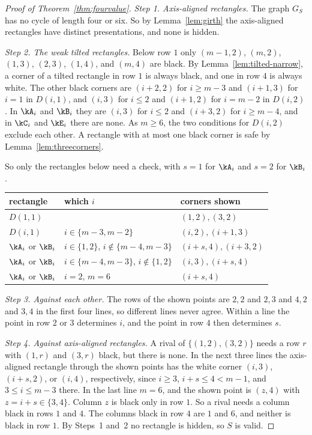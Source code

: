\begin{proof}[Proof of Theorem~\ref{thm:fourvalue}]
\emph{Step 1. Axis-aligned rectangles.} The graph $G_S$ has no cycle of length four or six. So by Lemma~\ref{lem:girth} the axis-aligned rectangles have distinct presentations, and none is hidden.

\emph{Step 2. The weak tilted rectangles.} Below row $1$ only $(m-1,2)$, $(m,2)$, $(1,3)$, $(2,3)$, $(1,4)$, and $(m,4)$ are black. By Lemma~\ref{lem:tilted-narrow}, a corner of a tilted rectangle in row $1$ is always black, and one in row $4$ is always white. The other black corners are $(i+2,2)$ for $i\ge m-3$ and $(i+1,3)$ for $i=1$ in $D(i,1)$, and $(i,3)$ for $i\le2$ and $(i+1,2)$ for $i=m-2$ in $D(i,2)$. In $\kA_i$ and $\kB_i$ they are $(i,3)$ for $i\le2$ and $(i+3,2)$ for $i\ge m-4$, and in $\kC_i$ and $\kE_i$ there are none. As $m\ge6$, the two conditions for $D(i,2)$ exclude each other. A rectangle with at most one black corner is safe by Lemma~\ref{lem:threecorners}.

So only the rectangles below need a check, with $s=1$ for $\kA_i$ and $s=2$ for $\kB_i$.
\begin{center}\small
\begin{tabular}{@{}lll@{}}
\toprule
rectangle & which $i$ & corners shown\\
\midrule
$D(1,1)$ & & $(1,2),(3,2)$\\
$D(i,1)$ & $i\in\{m-3,m-2\}$ & $(i,2),(i+1,3)$\\
$\kA_i$ or $\kB_i$ & $i\in\{1,2\}$, $i\notin\{m-4,m-3\}$ & $(i+s,4),(i+3,2)$\\
$\kA_i$ or $\kB_i$ & $i\in\{m-4,m-3\}$, $i\notin\{1,2\}$ & $(i,3),(i+s,4)$\\
$\kA_i$ or $\kB_i$ & $i=2$, $m=6$ & $(i+s,4)$\\
\bottomrule
\end{tabular}
\end{center}

\emph{Step 3. Against each other.} The rows of the shown points are $2,2$ and $2,3$ and $4,2$ and $3,4$ in the first four lines, so different lines never agree. Within a line the point in row $2$ or $3$ determines $i$, and the point in row $4$ then determines $s$.

\emph{Step 4. Against axis-aligned rectangles.} A rival of $\{(1,2),(3,2)\}$ needs a row $r$ with $(1,r)$ and $(3,r)$ black, but there is none. In the next three lines the axis-aligned rectangle through the shown points has the white corner $(i,3)$, $(i+s,2)$, or $(i,4)$, respectively, since $i\ge3$, $i+s\le4<m-1$, and $3\le i\le m-3$ there. In the last line $m=6$, and the shown point is $(z,4)$ with $z=i+s\in\{3,4\}$. Column $z$ is black only in row $1$. So a rival needs a column black in rows $1$ and $4$. The columns black in row $4$ are $1$ and $6$, and neither is black in row $1$. By Steps~1 and~2 no rectangle is hidden, so $S$ is valid.
\end{proof}

